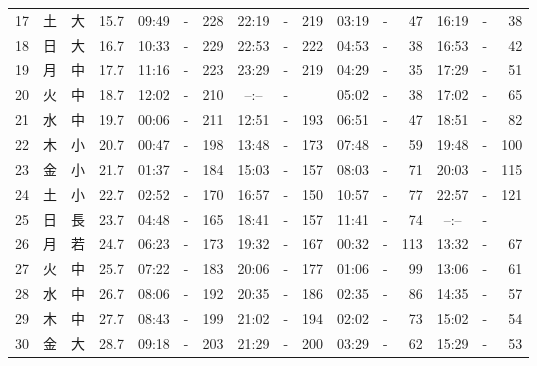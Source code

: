 \documentclass[12pt.a4j]{jsarticle}
\begin{document}
\begin{center}
\begin{table}[ht]
\begin{tabular}{|rc|cr|ccrccr|ccrccr|}
17 & 土 & 大 & 15.7 &  09:49 &-& 228  &  22:19 &-& 219  &   03:19 &-&  47  &   16:19 &-&  38  \\
18 & 日 & 大 & 16.7 &  10:33 &-& 229  &  22:53 &-& 222  &   04:53 &-&  38  &   16:53 &-&  42  \\
19 & 月 & 中 & 17.7 &  11:16 &-& 223  &  23:29 &-& 219  &   04:29 &-&  35  &   17:29 &-&  51  \\
20 & 火 & 中 & 18.7 &  12:02 &-& 210  &  --:-- &-&     &   05:02 &-&  38  &   17:02 &-&  65  \\
21 & 水 & 中 & 19.7 &  00:06 &-& 211  &  12:51 &-& 193  &   06:51 &-&  47  &   18:51 &-&  82  \\
22 & 木 & 小 & 20.7 &  00:47 &-& 198  &  13:48 &-& 173  &   07:48 &-&  59  &   19:48 &-& 100  \\
23 & 金 & 小 & 21.7 &  01:37 &-& 184  &  15:03 &-& 157  &   08:03 &-&  71  &   20:03 &-& 115  \\
24 & 土 & 小 & 22.7 &  02:52 &-& 170  &  16:57 &-& 150  &   10:57 &-&  77  &   22:57 &-& 121  \\
25 & 日 & 長 & 23.7 &  04:48 &-& 165  &  18:41 &-& 157  &   11:41 &-&  74  &   --:-- &-&     \\
26 & 月 & 若 & 24.7 &  06:23 &-& 173  &  19:32 &-& 167  &   00:32 &-& 113  &   13:32 &-&  67  \\
27 & 火 & 中 & 25.7 &  07:22 &-& 183  &  20:06 &-& 177  &   01:06 &-&  99  &   13:06 &-&  61  \\
28 & 水 & 中 & 26.7 &  08:06 &-& 192  &  20:35 &-& 186  &   02:35 &-&  86  &   14:35 &-&  57  \\
29 & 木 & 中 & 27.7 &  08:43 &-& 199  &  21:02 &-& 194  &   02:02 &-&  73  &   15:02 &-&  54  \\
30 & 金 & 大 & 28.7 &  09:18 &-& 203  &  21:29 &-& 200  &   03:29 &-&  62  &   15:29 &-&  53  \\
   \hline
   \end{tabular}
\end{table}
\end{center}
\end{document}
